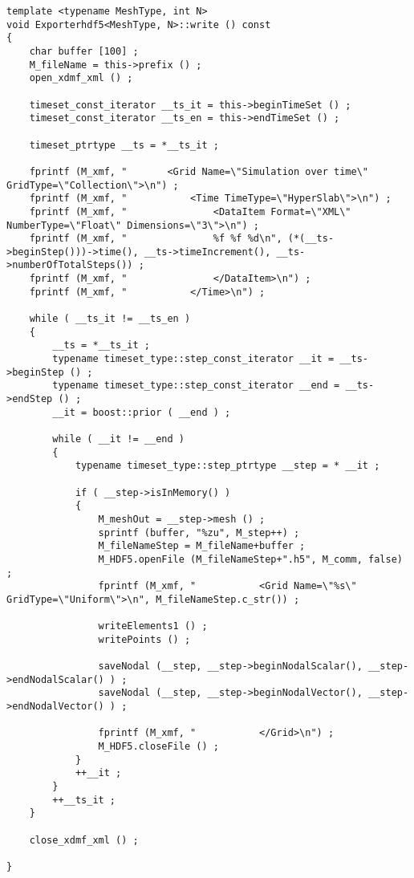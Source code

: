 \documentclass[10pt]{article}
\begin{document}
\begin{lstlisting}
template <typename MeshType, int N>
void Exporterhdf5<MeshType, N>::write () const 
{
    char buffer [100] ;
    M_fileName = this->prefix () ;
    open_xdmf_xml () ;

    timeset_const_iterator __ts_it = this->beginTimeSet () ;
    timeset_const_iterator __ts_en = this->endTimeSet () ;

    timeset_ptrtype __ts = *__ts_it ;

    fprintf (M_xmf, "       <Grid Name=\"Simulation over time\" GridType=\"Collection\">\n") ;
    fprintf (M_xmf, "           <Time TimeType=\"HyperSlab\">\n") ;
    fprintf (M_xmf, "               <DataItem Format=\"XML\" NumberType=\"Float\" Dimensions=\"3\">\n") ;
    fprintf (M_xmf, "               %f %f %d\n", (*(__ts->beginStep()))->time(), __ts->timeIncrement(), __ts->numberOfTotalSteps()) ;
    fprintf (M_xmf, "               </DataItem>\n") ;
    fprintf (M_xmf, "           </Time>\n") ;

    while ( __ts_it != __ts_en )
    {
        __ts = *__ts_it ;
        typename timeset_type::step_const_iterator __it = __ts->beginStep () ;
        typename timeset_type::step_const_iterator __end = __ts->endStep () ;
        __it = boost::prior ( __end ) ;

        while ( __it != __end )
        {
            typename timeset_type::step_ptrtype __step = * __it ;

            if ( __step->isInMemory() )
            {
                M_meshOut = __step->mesh () ;
                sprintf (buffer, "%zu", M_step++) ;
                M_fileNameStep = M_fileName+buffer ;
                M_HDF5.openFile (M_fileNameStep+".h5", M_comm, false) ;
                fprintf (M_xmf, "           <Grid Name=\"%s\" GridType=\"Uniform\">\n", M_fileNameStep.c_str()) ;

                writeElements1 () ;
                writePoints () ;

                saveNodal (__step, __step->beginNodalScalar(), __step->endNodalScalar() ) ;
                saveNodal (__step, __step->beginNodalVector(), __step->endNodalVector() ) ;

                fprintf (M_xmf, "           </Grid>\n") ;
                M_HDF5.closeFile () ;
            }
            ++__it ;
        }
        ++__ts_it ;
    }

    close_xdmf_xml () ;

}
\end{lstlisting}
\end{document}

